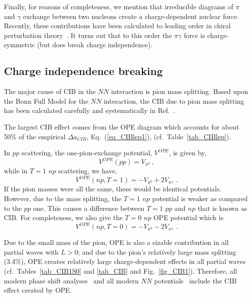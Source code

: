 Finally, for reasons of completeness, we mention that irreducible
diagrams of $\pi$ and $\gamma$ exchange between
two nucleons create a charge-dependent nuclear force.
Recently, these contributions have been calculated to
leading order in chiral perturbation theory~\cite{Kol98}.
It turns out that to this order the $\pi\gamma$ force is
charge-symmetric (but does break charge independence).



\subsection{Charge independence breaking}

The major cause of CIB in the $NN$ interaction is pion mass splitting.
Based upon the Bonn Full Model for the $NN$ interaction,
the CIB due to pion mass splitting has been calculated 
carefully and systematically in Ref.~\cite{LM98b}.

The largest CIB effect comes from the OPE diagram which
accounts for about 50\% of the empirical $\Delta a_{CIB}$, 
Eq.~(\ref{eq_CIBlep1}), (cf.\ Table~\ref{tab_CIBlep}). 

In $pp$ scattering, the one-pion-exchange potential, $V^{OPE}$,
is given by,
\begin{equation}
V^{OPE}(pp) = V_{\pi^0}
\: ,
\end{equation}
while in $T=1$ $np$ scattering, we have,
\begin{equation}
V^{OPE}(np, T=1) = -V_{\pi^0} + 2 V_{\pi^\pm}
\: .
\end{equation}
If the pion masses were all the same, these would be identical potentials.
However, due to the mass splitting, the $T=1$ $np$ potential is weaker
as compared to the $pp$ one. This causes a difference between $T=1$
$pp$ and $np$ that is known as CIB.
For completeness, we also give the $T=0$ $np$ OPE potential which is
\begin{equation}
V^{OPE}(np, T=0) = -V_{\pi^0} - 2 V_{\pi^\pm}
\: .
\end{equation}

Due to the small mass of the pion, OPE is also a sizable
contribution in all partial waves with $L>0$;
and due to the pion's relatively large mass splitting (3.4\%),
OPE creates relatively large charge-dependent effects 
in all partial waves 
(cf.\ Tables~\ref{tab_CIB1S0} and \ref{tab_CIB}
and Fig.~\ref{fig_CIB1}). Therefore,
all modern phase shift analyses~\cite{ASW94,Sto93} and all
modern $NN$ potentials~\cite{Sto94,WSS95,MSS96}
include the CIB effect created by OPE.

